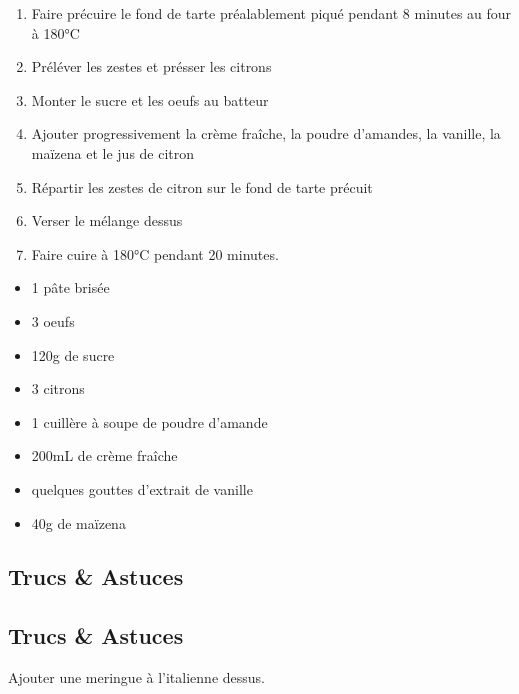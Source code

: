     \begin{minipage}{.7\textwidth}
        \begin{enumerate}
            \item Faire précuire le fond de tarte préalablement piqué pendant 8 minutes au four à 180°C
	    \item Préléver les zestes et présser les citrons
	    \item Monter le sucre et les oeufs au batteur
	    \item Ajouter progressivement la crème fraîche, la poudre d'amandes, la vanille, la maïzena et le jus de citron
	    \item Répartir les zestes de citron sur le fond de tarte précuit
	    \item Verser le mélange dessus
	    \item Faire cuire à 180°C pendant 20 minutes.

        \end{enumerate}
    \end{minipage}
    \begin{minipage}{.3\textwidth}
        \begin{flushleft}
        \begin{itemize}
            \item 1 pâte brisée
	    \item 3 oeufs
	    \item 120g de sucre
	    \item 3 citrons
	    \item 1 cuillère à soupe de poudre d'amande
	    \item 200mL de crème fraîche
	    \item quelques gouttes d'extrait de vanille
	    \item 40g de maïzena

        \end{itemize}
        \end{flushleft}
    \end{minipage}
    
    \vspace{1cm}
    \hline
    \vspace{1cm}
    
    \subsection{Trucs \& Astuces}
        \subsection{Trucs \& Astuces}
	Ajouter une meringue à l'italienne dessus.
